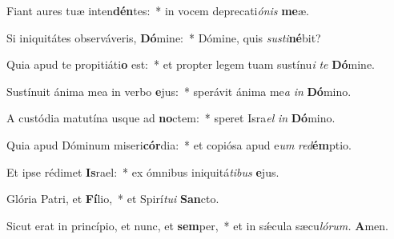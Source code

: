 \item Fiant aures tuæ inten\textbf{dén}tes:~* in vocem deprecati\textit{ónis} \textbf{me}æ.
\item Si iniquitátes observáveris, \textbf{Dó}mine:~* Dómine, quis \textit{susti}\hspace{-0.01em}\textbf{né}bit?
\item Quia apud te propitiáti\textbf{o} est:~* et propter legem tuam sustínu\textit{i} \textit{te} \textbf{Dó}mine.
\item Sustínuit ánima mea in verbo \textbf{e}jus:~* sperávit ánima me\hspace{0.03em}\textit{a} \textit{in} \textbf{Dó}mino.
\item A custódia matutína usque ad \textbf{no}ctem:~* speret Isra\hspace{0.03em}\textit{el} \textit{in} \textbf{Dó}mino.
\item Quia apud Dóminum miseri\textbf{cór}dia:~* et copiósa apud e\hspace{0.03em}\textit{um} \textit{red}\textbf{ém}ptio.
\item Et ipse rédimet \textbf{Is}rael:~* ex ómnibus iniquitá\hspace{0.03em}\textit{tibus} \textbf{e}jus.
\item Glória Patri, et \textbf{Fí}lio,~* et Spirí\hspace{0.03em}\textit{tui} \textbf{San}cto.
\item Sicut erat in princípio, et nunc, et \textbf{sem}per,~* et in sǽcula sæcu\hspace{0.03em}\textit{lórum.} \textbf{A}men.
